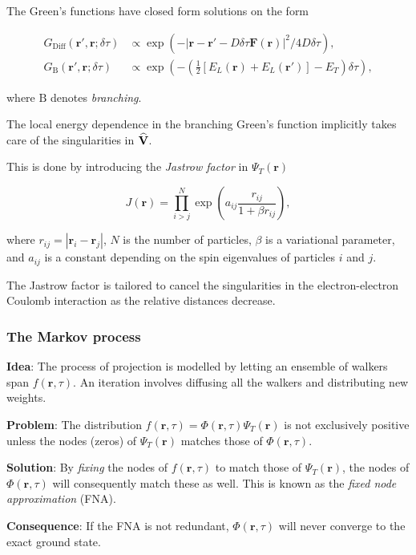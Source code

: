 \begin{frame}
 The Green's functions have closed form solutions on the form
 
 \begin{align*}
  G_{\mathrm{Diff}}(\mathbf{r}', \mathbf{r}; \delta\tau) &\propto \exp\left(-\left|\mathbf{r}-\mathbf{r}' - D\delta\tau \mathbf{F}(\mathbf{r})\right|^2/4D\delta\tau\right), \\
  G_{\mathrm{B}}(\mathbf{r}', \mathbf{r}; \delta\tau) &\propto \exp\left(-\left(\frac{1}{2}\left[E_L(\mathbf{r}) + E_L(\mathbf{r}')\right] - E_T\right)\delta\tau\right),
 \end{align*}

 where $\mathrm{B}$ denotes \textit{branching}.
 
\end{frame}

\begin{frame}
 The local energy dependence in the branching Green's function implicitly takes care of the singularities in ${\bf\widehat{V}}$. 
 \shift
 
 This is done by introducing the \textit{Jastrow factor} in $\Psi_T(\mathbf{r})$
 
 \begin{equation}
  J(\mathbf{r}) = \prod_{i > j}^N \exp\left(a_{ij} \frac{r_{ij}}{1 + \beta r_{ij}}\right),
 \end{equation}
 
 where $r_{ij} = |\mathbf{r}_i - \mathbf{r}_j|$, $N$ is the number of particles, $\beta$ is a variational parameter, and $a_{ij}$ is a constant depending on the spin eigenvalues of particles $i$ and $j$.
 \shift
 
 The Jastrow factor is tailored to cancel the singularities in the electron-electron Coulomb interaction as the relative distances decrease.
 
\end{frame}


\begin{frame}

 \frametitle{The Markov process}

 \textbf{Idea}: The process of projection is modelled by letting an ensemble of walkers span $f(\mathbf{r}, \tau)$. An iteration involves diffusing all the walkers and distributing new weights. 
 \shift
 
 \textbf{Problem}: The distribution $f(\mathbf{r}, \tau) = \Phi(\mathbf{r}, \tau)\Psi_T(\mathbf{r})$ is not exclusively positive unless the nodes (zeros) of $\Psi_T(\mathbf{r})$ matches those of $\Phi(\mathbf{r}, \tau)$. 
 \shift
 
 \textbf{Solution}: By \emph{fixing} the nodes of $f(\mathbf{r}, \tau)$ to match those of $\Psi_T(\mathbf{r})$, the nodes of $\Phi(\mathbf{r}, \tau)$ will consequently match these as well. This is known as the \textit{fixed node approximation} (FNA).
 \shift
 
 \textbf{Consequence}: If the FNA is not redundant, $\Phi(\mathbf{r}, \tau)$ will never converge to the exact ground state. 
\end{frame}


